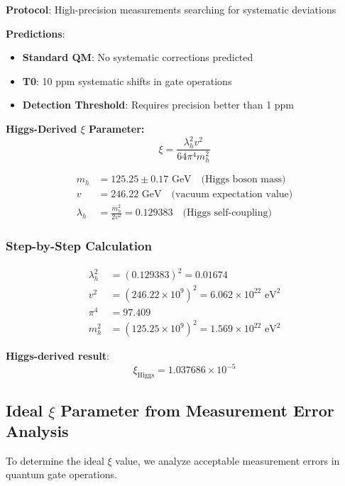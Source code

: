 	\textbf{Protocol}: High-precision measurements searching for systematic deviations
	
	\textbf{Predictions}:
	\begin{itemize}
		\item \textbf{Standard QM}: No systematic corrections predicted
		\item \textbf{T0}: 10 ppm systematic shifts in gate operations
		\item \textbf{Detection Threshold}: Requires precision better than 1 ppm
	\end{itemize}
	
	\textbf{Higgs-Derived $\xi$ Parameter:}
	\begin{equation}
		\xi = \frac{\lambda_h^2 v^2}{64\pi^4 m_h^2}
		\label{eq:higgs_xi_appendix}
	\end{equation}
	
	\begin{align}
		m_h &= 125.25 \pm 0.17 \text{ GeV} \quad \text{(Higgs boson mass)} \\
		v &= 246.22 \text{ GeV} \quad \text{(vacuum expectation value)} \\
		\lambda_h &= \frac{m_h^2}{2v^2} = 0.129383 \quad \text{(Higgs self-coupling)}
	\end{align}
	
	\subsubsection{Step-by-Step Calculation}
	
	\begin{align}
		\lambda_h^2 &= (0.129383)^2 = 0.01674 \\
		v^2 &= (246.22 \times 10^9)^2 = 6.062 \times 10^{22} \text{ eV}^2 \\
		\pi^4 &= 97.409 \\
		m_h^2 &= (125.25 \times 10^9)^2 = 1.569 \times 10^{22} \text{ eV}^2
	\end{align}
	
	\textbf{Higgs-derived result}:
	\begin{equation}
		\xi_{\text{Higgs}} = 1.037686 \times 10^{-5}
	\end{equation}
	
	\subsection{Ideal $\xi$ Parameter from Measurement Error Analysis}
	
	To determine the ideal $\xi$ value, we analyze acceptable measurement errors in quantum gate operations.
	
